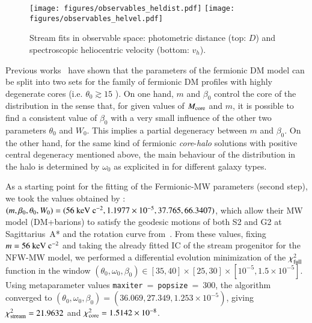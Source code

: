 \documentclass[twocolumn]{aa}
\begin{document}
\begin{figure}
   \texttt{[image: figures/observables\_heldist.pdf]}
   \texttt{[image: figures/observables\_helvel.pdf]}
   \caption{Stream fits in observable space: photometric distance (top: $D$) and
   spectroscopic heliocentric velocity (bottom: $v_h$).}
   \label{fig:obs_radial}
\end{figure}
Previous works~\citep{arguelles_novel_2018,2019PDU....24..278A,2023ApJ...945....1K} have shown that the parameters of the fermionic DM model can be split into two sets for the family of fermionic DM profiles with highly degenerate cores (i.e. $\theta_0 \gtrsim 15$ \citealp{2019PDU....24..278A}). On one hand, $m$ and $\beta_0$ control the core of the distribution in the sense that, for given values of $M_{\rm{core}}$ and $m$, it is possible to find a consistent value of $\beta_0$ with a very small influence of the other two parameters $\theta_0$ and $W_0$. This implies a partial degeneracy between $m$ and $\beta_0$.
On the other hand, for the same kind of fermionic \textit{core}-\textit{halo} solutions with positive central degeneracy mentioned above, the main behaviour of the distribution in the halo is determined by $\omega_0$ as explicited in \cite{2019PDU....24..278A} for different galaxy types.

As a starting point for the fitting of the Fermionic-MW parameters (second step), we took the values obtained by \citet{2020A&A...641A..34B}: $(m, \beta_0, \theta_0, W_0)=(56~\rm{keV}~c^{-2}, 1.1977\times10^{-5}, 37.765, 66.3407)$, which allow their MW model (DM+barions) to satisfy the geodesic motions of both S2 and G2 at Sagittarius~A* and the rotation curve from~\citet{sofue_rotation_2013}.
From these values, fixing $m=56~\rm{keV}~c^{-2}$ and taking the already fitted IC of the stream progenitor for the NFW-MW model, we performed a differential evolution minimization of the
$\chi^2_{\rm{full}}$ function in the window
$(\theta_0,\omega_0, \beta_0)\in [35, 40]\times[25, 30]\times[10^{-5}, 1.5\times10^{-5}]$. Using metaparameter values \texttt{maxiter}$~=~$\texttt{popsize}$~=~$300, the algorithm converged to
$(\theta_0, \omega_0, \beta_0)= (36.069, 27.349 , 1.253\times10^{-5})$, giving
$\chi^2_{\rm{stream}}= 21.9632$ and  $\chi^2_{\rm{core}}= 1.5142\times10^{-8}$.
\end{document}
